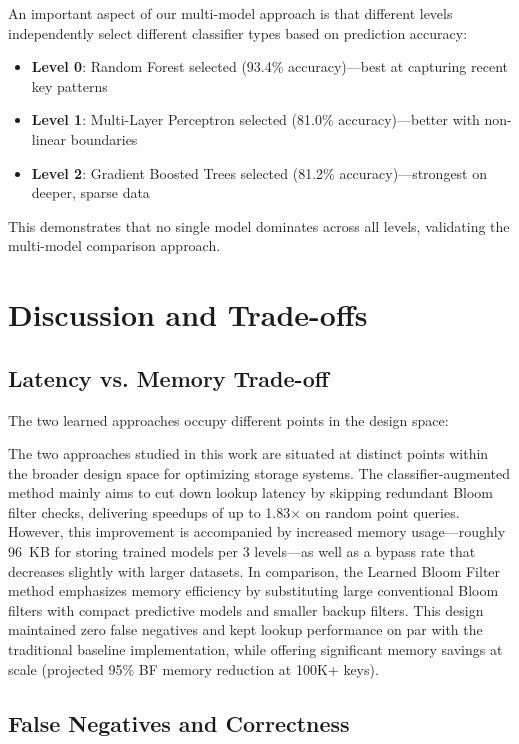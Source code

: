 \documentclass{mnitjaipur}
\begin{document}
An important aspect of our multi-model approach is that different levels independently select different classifier types based on prediction accuracy:

\begin{itemize}
    \item \textbf{Level 0}: Random Forest selected (93.4\% accuracy)---best at capturing recent key patterns
    \item \textbf{Level 1}: Multi-Layer Perceptron selected (81.0\% accuracy)---better with non-linear boundaries
    \item \textbf{Level 2}: Gradient Boosted Trees selected (81.2\% accuracy)---strongest on deeper, sparse data
\end{itemize}

This demonstrates that no single model dominates across all levels, validating the multi-model comparison approach.

\section{Discussion and Trade-offs}

\subsection{Latency vs. Memory Trade-off}

The two learned approaches occupy different points in the design space:

The two approaches studied in this work are situated at distinct points within the broader design space for optimizing storage systems. The classifier-augmented method mainly aims to cut down lookup latency by skipping redundant Bloom filter checks, delivering speedups of up to 1.83$\times$ on random point queries. However, this improvement is accompanied by increased memory usage---roughly 96~KB for storing trained models per 3 levels---as well as a bypass rate that decreases slightly with larger datasets. In comparison, the Learned Bloom Filter method emphasizes memory efficiency by substituting large conventional Bloom filters with compact predictive models and smaller backup filters. This design maintained zero false negatives and kept lookup performance on par with the traditional baseline implementation, while offering significant memory savings at scale (projected 95\% BF memory reduction at 100K+ keys).

\subsection{False Negatives and Correctness}
\end{document}
